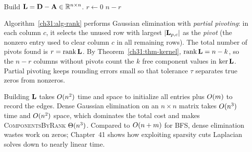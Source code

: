 \begin{algorithm}[H]
\caption{\textsc{ComponentsByRank}$(\Gph)$ --- count components via $\dim\ker\Lap$}
\label{ch31:alg-rank}
\DontPrintSemicolon
{}
Build $\mathbf{L} = \mathbf{D} - \mathbf{A} \in \mathbb{R}^{n\times n}$.\;
$r \gets 0$
\Return $n - r$\;
\end{algorithm}

\begin{whybox}
Algorithm~\ref{ch31:alg-rank} performs Gaussian elimination with \emph{partial pivoting}: in each column $c$, it selects the unused row with largest $\lvert\mathbf{L}_{p,c}\rvert$ as the \emph{pivot} (the nonzero entry used to clear column $c$ in all remaining rows). The total number of pivots found is $r = \operatorname{rank}\mathbf{L}$. By Theorem~\ref{ch31:thm-kernel}, $\operatorname{rank}\mathbf{L} = n-k$, so the $n-r$ columns without pivots count the $k$ free component values in $\ker\mathbf{L}$. Partial pivoting keeps rounding errors small so that tolerance $\tau$ separates true zeros from nonzeros.
\end{whybox}

\begin{complexitybox}
Building $\mathbf{L}$ takes $O(n^2)$ time and space to initialize all entries plus $O(m)$ to record the edges. Dense Gaussian elimination on an $n\times n$ matrix takes $O(n^3)$ time and $O(n^2)$ space, which dominates the total cost and makes \textsc{ComponentsByRank} $\Theta(n^3)$. Compared to $O(n+m)$ for BFS, dense elimination wastes work on zeros; Chapter~41 shows how exploiting sparsity cuts Laplacian solves down to nearly linear time.
\end{complexitybox}

